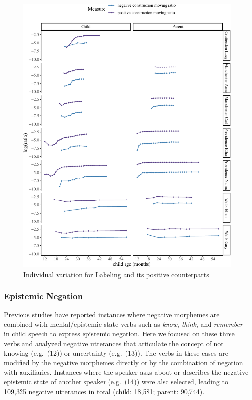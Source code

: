 \documentclass[
  english,
  man,floatsintext]{apa6}
\begin{document}
\begin{figure}[H]

{\centering \includegraphics{neg_construction_article_files/figure-latex/individuallearning-1} 

}

\caption{Individual variation for Labeling and its positive counterparts}\label{fig:individuallearning}
\end{figure}

\clearpage

\hypertarget{epistemic-negation}{%
\subsubsection{Epistemic Negation}\label{epistemic-negation}}

Previous studies have reported instances where negative morphemes are combined with mental/epistemic state verbs such as \emph{know}, \emph{think}, and \emph{remember} in child speech to express epistemic negation. Here we focused on these three verbs and analyzed negative utterances that articulate the concept of not knowing (e.g.~(12)) or uncertainty (e.g.~(13)). The verbs in these cases are modified by the negative morphemes directly or by the combination of negation with auxiliaries. Instances where the speaker asks about or describes the negative epistemic state of another speaker (e.g.~(14)) were also selected, leading to 109,325 negative utterances in total (child: 18,581; parent: 90,744).
\end{document}

